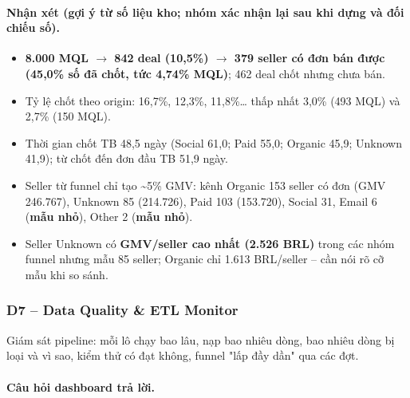

\paragraph{Nhận xét (gợi ý từ số liệu kho; \textbf{nhóm xác nhận lại sau khi dựng và đối chiếu số}).}

\begin{itemize}
  \item \textbf{8.000 MQL $\rightarrow$ 842 deal (10,5\%) $\rightarrow$ 379 seller có đơn bán được (45,0\% số đã chốt, tức 4,74\% MQL)}; 462 deal chốt nhưng chưa bán.
  \item Tỷ lệ chốt theo origin:  16,7\%,  12,3\%,  11,8\%… thấp nhất  3,0\% (493 MQL) và  2,7\% (150 MQL).
  \item Thời gian chốt TB 48,5 ngày (Social 61,0; Paid 55,0; Organic 45,9; Unknown 41,9); từ chốt đến đơn đầu TB 51,9 ngày.
  \item Seller từ funnel chỉ tạo \textasciitilde{}5\% GMV: kênh Organic 153 seller có đơn (GMV 246.767), Unknown 85 (214.726), Paid 103 (153.720), Social 31, Email 6 (\textbf{mẫu nhỏ}), Other 2 (\textbf{mẫu nhỏ}).
  \item Seller Unknown có \textbf{GMV/seller cao nhất (2.526 BRL)} trong các nhóm funnel nhưng mẫu 85 seller; Organic chỉ 1.613 BRL/seller – cần nói rõ cỡ mẫu khi so sánh.
\end{itemize}

\subsubsection*{D7 – Data Quality \& ETL Monitor}

Giám sát pipeline: mỗi lô chạy bao lâu, nạp bao nhiêu dòng, bao nhiêu dòng bị loại và vì sao, kiểm thử có đạt không, funnel "lấp đầy dần" qua các đợt.

\paragraph{Câu hỏi dashboard trả lời.}

